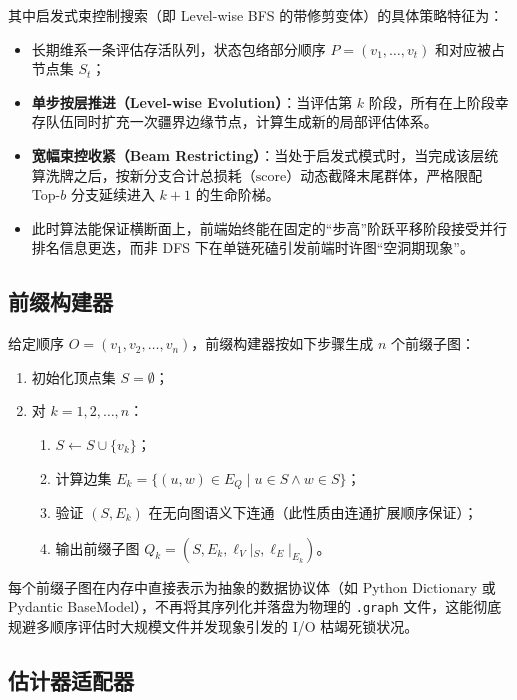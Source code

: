 \documentclass[12pt,a4paper]{article}
\begin{document}
其中启发式束控制搜索（即 Level-wise BFS 的带修剪变体）的具体策略特征为：
\begin{itemize}
  \item 长期维系一条评估存活队列，状态包络部分顺序 $P=(v_1,\dots,v_t)$ 和对应被占节点集 $S_t$；
  \item \textbf{单步按层推进（Level-wise Evolution）}：当评估第 $k$ 阶段，所有在上阶段幸存队伍同时扩充一次疆界边缘节点，计算生成新的局部评估体系。
  \item \textbf{宽幅束控收紧（Beam Restricting）}：当处于启发式模式时，当完成该层统算洗牌之后，按新分支合计总损耗（$\mathrm{score}$）动态截降末尾群体，严格限配 Top-$b$ 分支延续进入 $k+1$ 的生命阶梯。
  \item 此时算法能保证横断面上，前端始终能在固定的“步高”阶跃平移阶段接受并行排名信息更迭，而非 DFS 下在单链死磕引发前端时许图“空洞期现象”。
\end{itemize}

\subsection{前缀构建器}
\label{sec:prefix-builder}

给定顺序 $O = (v_1, v_2, \dots, v_n)$，前缀构建器按如下步骤生成 $n$ 个前缀子图：

\begin{enumerate}
  \item 初始化顶点集 $S = \emptyset$；
  \item 对 $k = 1, 2, \dots, n$：
        \begin{enumerate}
          \item $S \gets S \cup \{v_k\}$；
          \item 计算边集 $E_k = \{(u, w) \in E_Q \mid u \in S \wedge w \in S\}$；
          \item 验证 $(S, E_k)$ 在无向图语义下连通（此性质由连通扩展顺序保证）；
          \item 输出前缀子图 $Q_k = (S, E_k, \ell_V|_S, \ell_E|_{E_k})$。
        \end{enumerate}
\end{enumerate}

每个前缀子图在内存中直接表示为抽象的数据协议体（如 Python Dictionary 或 Pydantic BaseModel），不再将其序列化并落盘为物理的 \texttt{.graph} 文件，这能彻底规避多顺序评估时大规模文件并发现象引发的 I/O 枯竭死锁状况。

\subsection{估计器适配器}
\label{sec:estimator-adapter}
\end{document}
